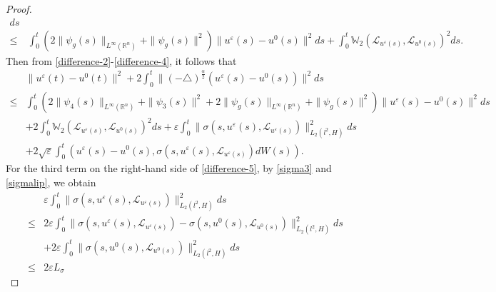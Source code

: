 \documentclass[11pt]{article}
\numberwithin{equation}{section}
\theoremstyle{plain}
\def\leq{\leqslant}
\begin{document}
\begin{proof}
\begin{align}
        ds \nonumber \\
        \leq & \int_0^t
        \left( 2 \|\psi_g(s)\|_{L^\infty(\mathbb{R}^n)}
        +  \| \psi_g(s) \|^2
        \right)
        \| u^\varepsilon(s) - u^0(s) \|^2
        ds
        + \int_0^t
        \mathbb{W}_2 \left( \mathcal{L}_{u^\varepsilon(s)}, \mathcal{L}_{u^0(s)}
        \right)^2
        ds.
    \end{align}
    Then from \eqref{difference-2}-\eqref{difference-4},
    it follows that
    \begin{align} \label{difference-5}
        & \| u^\varepsilon(t) - u^0 (t) \|^2
        + 2 \int_0^t \| (-\triangle)^{\frac{\alpha}{2}} \left( u^\varepsilon(s) - u^0 (s) \right) \|^2 ds
        \nonumber \\
        \leq & \int_0^t
        \left( 2 \| \psi_4(s) \|_{L^\infty(\mathbb{R}^n)}
        + \| \psi_3(s) \|^2
        + 2 \|\psi_g(s)\|_{L^\infty(\mathbb{R}^n)}
        + \| \psi_g(s) \|^2
        \right)
        \| u^\varepsilon(s) - u^0(s) \|^2
        ds  \nonumber \\
        & + 2 \int_0^t
        \mathbb{W}_2
        \left(
        \mathcal{L}_{u^\varepsilon(s)},
        \mathcal{L}_{u^0(s)}
        \right)^2
        ds
        + \varepsilon
        \int_0^t
        \| \sigma(s, u^\varepsilon (s), \mathcal{L}_{u^\varepsilon (s)} )
        \|_{L_2(l^2,H)}^2 ds
        \nonumber \\
        & + 2 \sqrt{\varepsilon}
        \int_0^t
        \left( u^\varepsilon(s) - u^0 (s),
        \sigma(s, u^\varepsilon (s), \mathcal{L}_{u^\varepsilon (s)} ) dW(s)
        \right).
    \end{align}
    For the third term on the right-hand side of \eqref{difference-5},
    by \eqref{sigma3} and \eqref{sigmalip}, we obtain
    \begin{align} \label{difference-6}
        & \varepsilon
        \int_0^t
        \| \sigma(s, u^\varepsilon (s), \mathcal{L}_{u^\varepsilon (s)} )
        \|_{L_2(l^2,H)}^2 ds
        \nonumber \\
        \leq  & 2 \varepsilon
        \int_0^t
        \| \sigma(s, u^\varepsilon (s), \mathcal{L}_{u^\varepsilon (s)} )
        - \sigma(s, u^0 (s), \mathcal{L}_{u^0(s)} )
        \|_{L_2(l^2,H)}^2 ds
        \nonumber \\
        & + 2 \varepsilon
        \int_0^t
        \| \sigma(s, u^0 (s), \mathcal{L}_{u^0(s)} )
        \|_{L_2(l^2,H)}^2 ds
        \nonumber \\
        \leq & 2 \varepsilon L_{\sigma}

\end{align}
\end{proof}
\end{document}
